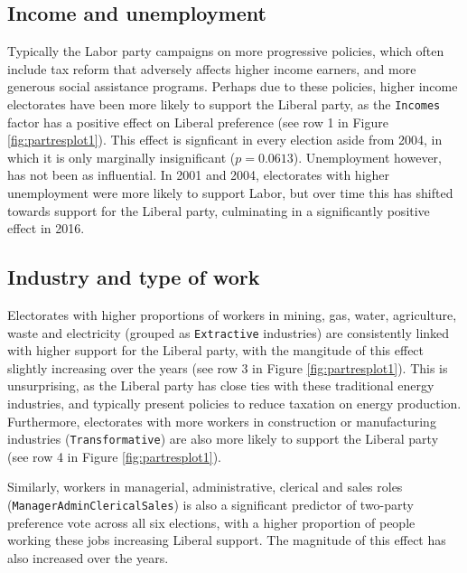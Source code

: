 \documentclass[openany]{book}
\begin{document}
\hypertarget{income-and-unemployment}{%
\subsection{Income and unemployment}\label{income-and-unemployment}}

Typically the Labor party campaigns on more progressive policies, which often include tax reform that adversely affects higher income earners, and more generous social assistance programs. Perhaps due to these policies, higher income electorates have been more likely to support the Liberal party, as the \texttt{Incomes} factor has a positive effect on Liberal preference (see row 1 in Figure \ref{fig:partresplot1}). This effect is signficant in every election aside from 2004, in which it is only marginally insignificant (\(p = 0.0613\)). Unemployment however, has not been as influential. In 2001 and 2004, electorates with higher unemployment were more likely to support Labor, but over time this has shifted towards support for the Liberal party, culminating in a significantly positive effect in 2016.

\hypertarget{industry-and-type-of-work}{%
\subsection{Industry and type of work}\label{industry-and-type-of-work}}

Electorates with higher proportions of workers in mining, gas, water, agriculture, waste and electricity (grouped as \texttt{Extractive} industries) are consistently linked with higher support for the Liberal party, with the mangitude of this effect slightly increasing over the years (see row 3 in Figure \ref{fig:partresplot1}). This is unsurprising, as the Liberal party has close ties with these traditional energy industries, and typically present policies to reduce taxation on energy production. Furthermore, electorates with more workers in construction or manufacturing industries (\texttt{Transformative}) are also more likely to support the Liberal party (see row 4 in Figure \ref{fig:partresplot1}).

Similarly, workers in managerial, administrative, clerical and sales roles (\texttt{ManagerAdminClericalSales}) is also a significant predictor of two-party preference vote across all six elections, with a higher proportion of people working these jobs increasing Liberal support. The magnitude of this effect has also increased over the years.
\end{document}
